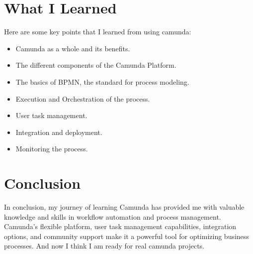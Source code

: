 \documentclass[12pt]{article}
\begin{document}
{  \pagebreak

  \section{What I Learned}

  Here are some key points that I learned from using camunda:

  \begin{itemize}[noitemsep,nolistsep]
    \item Camunda as a whole and its benefits.
    \item The different components of the Camunda Platform.
    \item The basics of BPMN, the standard for process modeling.
    \item Execution and Orchestration of the process.
    \item User task management.
    \item Integration and deployment.
    \item Monitoring the process.
  \end{itemize}

  \section{Conclusion}

  In conclusion, my journey of learning Camunda has provided me with valuable knowledge and skills in workflow automation and process management. Camunda's flexible platform, user task management capabilities, integration options, and community support make it a powerful tool for optimizing business processes.
  And now I think I am ready for real camunda projects.

  }

  \printbibliography
\end{document}
